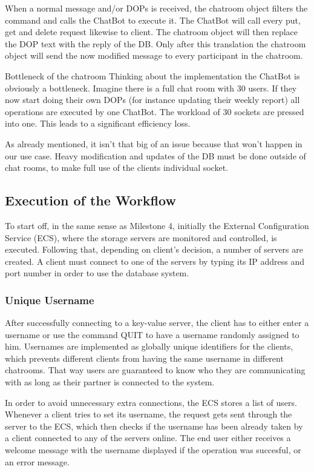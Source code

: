 When a normal message and/or DOPs is received, the chatroom object filters the command and calls the ChatBot to execute it. The ChatBot will call every put, get and delete request likewise to client. The chatroom object will then replace the DOP text with the reply of the DB. Only after this translation the chatroom object will send the now modified message to every participant in the chatroom.

Bottleneck of the chatroom
Thinking about the implementation the ChatBot is obviously a bottleneck. Imagine there is a full chat room with 30 users. If they now start doing their own DOPs (for instance updating their weekly report) all operations are executed by one ChatBot. The workload of 30 sockets are pressed into one. This leads to a significant efficiency loss.

As already mentioned, it isn’t that big of an issue because that won’t happen in our use case. Heavy modification and updates of the DB must be done outside of chat rooms, to make full use of the clients individual socket.



\subsection{Execution of the Workflow}
\label{sec:groupchat_executionoftheworkflow}

To start off, in the same sense as Milestone 4, initially the External Configuration Service (ECS), where the storage servers are monitored and controlled, is executed. Following that, depending on client's decision, a number of servers are created. A client must connect to one of the servers by typing its IP address and port number in order to use the database system.

\subsubsection{Unique Username}
\label{sec:groupchat_executionoftheworkflow_uniqueusername}
After successfully connecting to a key-value server, the client has to either enter a username or use the command QUIT to have a username randomly assigned to him. Usernames are implemented as globally unique identifiers for the clients, which prevents different clients from having the same username in different chatrooms. That way users are guaranteed to know who they are communicating with as long as their partner is connected to the system. 

In order to avoid unnecessary extra connections, the ECS stores a list of users. Whenever a client tries to set its username, the request gets sent through the server to the ECS, which then checks if the username has been already taken by a client connected to any of the servers online. The end user either receives a welcome message with the username displayed if the operation was succesful, or an error message.
 
